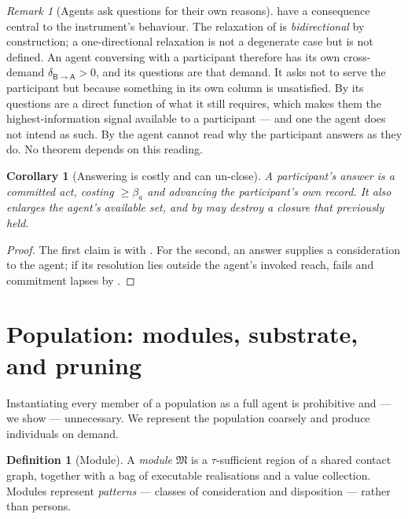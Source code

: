 \documentclass[11pt,a4paper]{article}
\theoremstyle{clstyle}
\newtheorem{corollary}[theorem]{Corollary}
\theoremstyle{definition}
\newtheorem{definition}[theorem]{Definition}
\theoremstyle{remark}
\newtheorem{remark}[theorem]{Remark}
\newcommand{\flo}{\beta}
\newcommand{\Mod}{\mathfrak{M}}
\newcommand{\dem}{\delta}
\newcommand{\colA}{\mathsf{A}}
\newcommand{\colB}{\mathsf{B}}
\begin{document}
\begin{remark}[Agents ask questions for their own reasons]
\label{rem:agents-ask}
 have a consequence central to the instrument's
behaviour. The relaxation of  is \emph{bidirectional} by
construction; a one-directional relaxation is not a degenerate case but is
not defined. An agent conversing with a participant therefore has its own
cross-demand $\dem_{\colB\to\colA}>0$, and its questions are that demand. It
asks not to serve the participant but because something in its own column is
unsatisfied. By  its questions are a direct function of what
it still requires, which makes them the highest-information signal available
to a participant --- and one the agent does not intend as such. By
 the agent cannot read why the participant answers as they
do. No theorem depends on this reading.
\end{remark}

\begin{corollary}[Answering is costly and can un-close]
\label{cor:answering-costs}
A participant's answer is a committed act, costing $\ge\flo_a$ and advancing
the participant's own record. It also enlarges the agent's available set, and
by  may destroy a closure that previously held.
\end{corollary}

\begin{proof}
The first claim is  with . For the second,
an answer supplies a consideration to the agent; if its resolution lies
outside the agent's invoked reach,  fails and commitment
lapses by .
\end{proof}

\section{Population: modules, substrate, and pruning}
\label{sec:population}

Instantiating every member of a population as a full agent is prohibitive and
--- we show --- unnecessary. We represent the population coarsely and produce
individuals on demand.

\begin{definition}[Module]
\label{def:module}
A \emph{module} $\Mod$ is a $\tau$-sufficient region of a shared contact
graph, together with a bag of executable realisations and a value
collection. Modules represent \emph{patterns} --- classes of consideration
and disposition --- rather than persons.
\end{definition}
\end{document}
